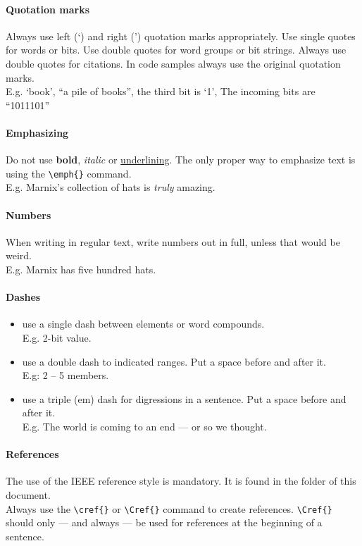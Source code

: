 \paragraph{Quotation marks} 
Always use left (`) and right (') quotation marks appropriately.
Use single quotes for words or bits.
Use double quotes for word groups or bit strings.
Always use double quotes for citations.
In code samples always use the original quotation marks.\\
E.g. `book', ``a pile of books'', the third bit is `1', The incoming bits are ``1011101''

\paragraph{Emphasizing}
Do not use \textbf{bold}, \textit{italic} or \underline{underlining}.
The only proper way to emphasize text is using the \verb|\emph{}| command. \\
E.g. Marnix's collection of hats is \emph{truly} amazing.

\paragraph{Numbers}
When writing in regular text, write numbers out in full, unless that would be weird. \\
E.g. Marnix has five hundred hats.

\paragraph{Dashes}
\begin{itemize}
\item use a single dash between elements or word compounds. \\
E.g. 2-bit value.
\item use a double dash to indicated ranges. Put a space before and after it.\\
E.g: 2 -- 5 members.
\item use a triple (em) dash for digressions in a sentence. Put a space before and after it. \\
E.g. The world is coming to an end --- or so we thought.
\end{itemize}

\paragraph{References}
The use of the IEEE reference style is mandatory. 
It is found in the folder of this document.\\
Always use the \verb|\cref{}| or \verb|\Cref{}| command to create references. \verb|\Cref{}| should only --- and always --- be used for references at the beginning of a sentence.

